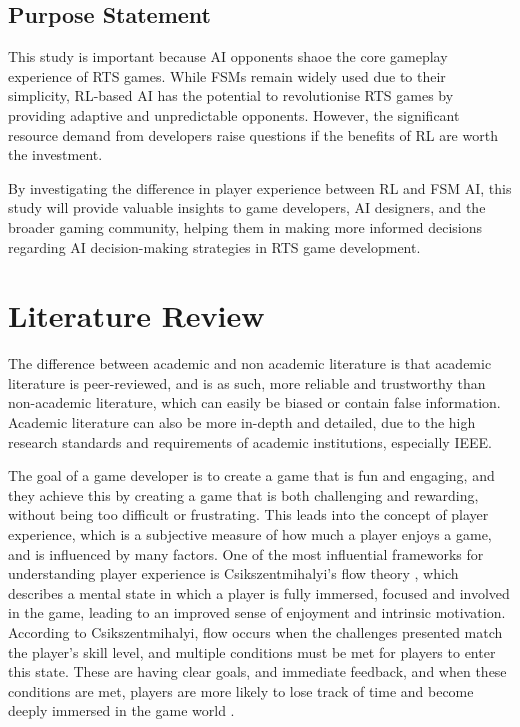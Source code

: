 \documentclass[conference]{IEEEtran}
\begin{document}
\subsection{Purpose Statement}

This study is important because AI opponents shaoe the core gameplay experience of RTS games. While FSMs remain widely used due to their simplicity, RL-based AI has the potential to revolutionise
RTS games by providing adaptive and unpredictable opponents. However, the significant resource demand from developers raise questions if the benefits of RL are worth the investment.

By investigating the difference in player experience between RL and FSM AI, this study will provide valuable insights to game developers, AI designers, and the broader gaming community, helping them
in making more informed decisions regarding AI decision-making strategies in RTS game development.

\section{Literature Review}

The difference between academic and non academic literature is that academic literature is peer-reviewed, and is as such, more reliable and trustworthy
than non-academic literature, which can easily be biased or contain false information. Academic literature can also be more in-depth and detailed, due to
the high research standards and requirements of academic institutions, especially IEEE.


The goal of a game developer is to create a game that is fun and engaging, and they achieve this by creating a game that is both challenging and rewarding, without being too difficult or frustrating.
This leads into the concept of player experience, which is a subjective measure of how much a player enjoys a game, and is influenced by many factors. One of the most influential frameworks for understanding player
experience is Csikszentmihalyi's flow theory \cite{csikszentmihalyi_flow_1990}, which describes a mental state in which a player is fully immersed, focused and involved in the game, leading to an improved sense of
enjoyment and intrinsic motivation. According to Csikszentmihalyi, flow occurs when the challenges presented match the player's skill level, and multiple conditions must be met for players to enter this state.
These are having clear goals, and immediate feedback, and when these conditions are met, players are more likely to lose track of time and become deeply immersed in the game world \cite{csikszentmihalyi_flow_1990}.
\end{document}
